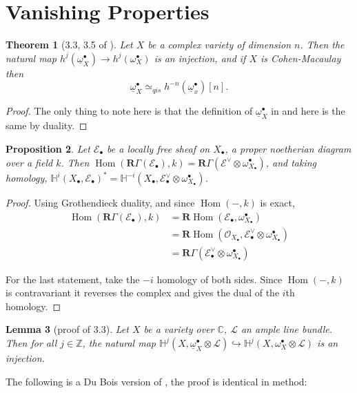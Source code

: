 \documentclass[proquest]{uwthesis}[2014/11/13]
\newtheorem{theorem}{Theorem}[section]
\newtheorem{prop}[theorem]{Proposition}
\newtheorem{lemma}[theorem]{Lemma}
\theoremstyle{definition}
\DeclareMathOperator{\Hom}{Hom}
\newcommand{\CC}{\mathbb{C}}
\newcommand{\EE}{\mathscr{E}}
\newcommand{\HH}{\mathbb{H}}
\newcommand{\LL}{\mathcal{L}}
\newcommand{\OO}{\mathcal{O}}
\newcommand{\qis}{\simeq_{qis}}
\newcommand{\bR}{\textbf{R}}
\newcommand{\ZZ}{\mathbb{Z}}
\newcommand{\db}{\underline{\omega}^\bullet}
\begin{document}
\section{Vanishing Properties}

\begin{theorem}[3.3, 3.5 of \cite{Kovacs2011a}]
	\label{thm:duboisgr}
	Let $X$ be a complex variety of dimension $n$.
	Then the natural map $h^j (\db_X) \rightarrow h^j (\omega_X^\bullet)$ is an injection, and if $X$ is Cohen-Macaulay then
	\[
		\db_X \qis h^{-n} (\db_x)[n].
	\]
\end{theorem}
\begin{proof}
	The only thing to note here is that the definition of $\db_X$ in \cite{Kovacs2011a} and here is the same by duality.
\end{proof}

\begin{prop}
	\label{prp:cohofdual}
	Let $\EE_\bullet$ be a locally free sheaf on $X_\bullet$, a proper noetherian diagram over a field $k$.
	Then $\Hom(\bR \Gamma(\EE_\bullet),k) = \bR \Gamma(\EE^\vee \otimes \omega_{X_\bullet}^\bullet)$, and taking homology,
	$\HH^i (X_\bullet, \EE_\bullet)^* = \HH^{-i}(X_\bullet, \EE_\bullet^\vee \otimes \omega_{X_\bullet}^\bullet)$.
\end{prop}
\begin{proof}
	Using Grothendieck duality, and since $\Hom(-,k)$ is exact,
	\begin{align*}
		\Hom(\bR \Gamma(\EE_\bullet),k) &= \bR \Hom(\EE_\bullet, \omega_{X_\bullet}^\bullet) \\
		&= \bR \Hom(\OO_{X_\bullet}, \EE_\bullet^\vee \otimes \omega_{X_\bullet}^\bullet) \\
		&= \bR \Gamma(\EE_\bullet^\vee \otimes \omega_{X_\bullet}^\bullet)
	\end{align*}
	
	For the last statement, take the $-i$ homology of both sides.
	Since $\Hom(-,k)$ is contravariant it reverses the complex and gives the dual of the $i$th homology.
\end{proof}

\begin{lemma}[proof of \cite{Kovacs2011a} 3.3]
	Let $X$ be a variety over $\CC$, $\LL$ an ample line bundle.
	Then for all $j \in \ZZ$, the natural map
	$\HH^j(X, \db_X \otimes \LL) \hookrightarrow \HH^j(X,\omega_X^\bullet \otimes \LL)$ is an injection.
\end{lemma}

The following is a Du Bois version of \cite{Kovacs1999}, the proof is identical in method:
\end{document}
